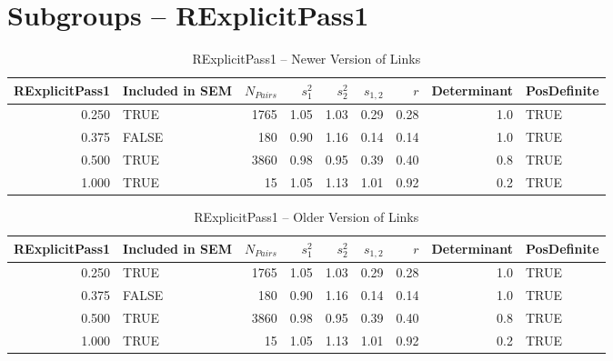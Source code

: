 \documentclass{article}\usepackage{graphicx, color}
\begin{document}
\section{Subgroups --  RExplicitPass1 }%
\begin{table}[ht]
\begin{center}
\begin{tabular}{rlrrrrrrl}
  \hline
RExplicitPass1 & Included in SEM & $N_{Pairs}$ & $s_1^2$ & $s_2^2$ & $s_{1,2}$ & $r$ & Determinant & PosDefinite \\ 
  \hline
0.250 & TRUE & 1765 & 1.05 & 1.03 & 0.29 & 0.28 & 1.0 & TRUE \\ 
  0.375 & FALSE & 180 & 0.90 & 1.16 & 0.14 & 0.14 & 1.0 & TRUE \\ 
  0.500 & TRUE & 3860 & 0.98 & 0.95 & 0.39 & 0.40 & 0.8 & TRUE \\ 
  1.000 & TRUE & 15 & 1.05 & 1.13 & 1.01 & 0.92 & 0.2 & TRUE \\ 
   \hline
\end{tabular}
\caption{RExplicitPass1 -- Newer Version of Links}
\end{center}
\end{table}
\begin{table}[ht]
\begin{center}
\begin{tabular}{rlrrrrrrl}
  \hline
RExplicitPass1 & Included in SEM & $N_{Pairs}$ & $s_1^2$ & $s_2^2$ & $s_{1,2}$ & $r$ & Determinant & PosDefinite \\ 
  \hline
0.250 & TRUE & 1765 & 1.05 & 1.03 & 0.29 & 0.28 & 1.0 & TRUE \\ 
  0.375 & FALSE & 180 & 0.90 & 1.16 & 0.14 & 0.14 & 1.0 & TRUE \\ 
  0.500 & TRUE & 3860 & 0.98 & 0.95 & 0.39 & 0.40 & 0.8 & TRUE \\ 
  1.000 & TRUE & 15 & 1.05 & 1.13 & 1.01 & 0.92 & 0.2 & TRUE \\ 
   \hline
\end{tabular}
\caption{RExplicitPass1 -- Older Version of Links}
\end{center}
\end{table}
\end{document}
